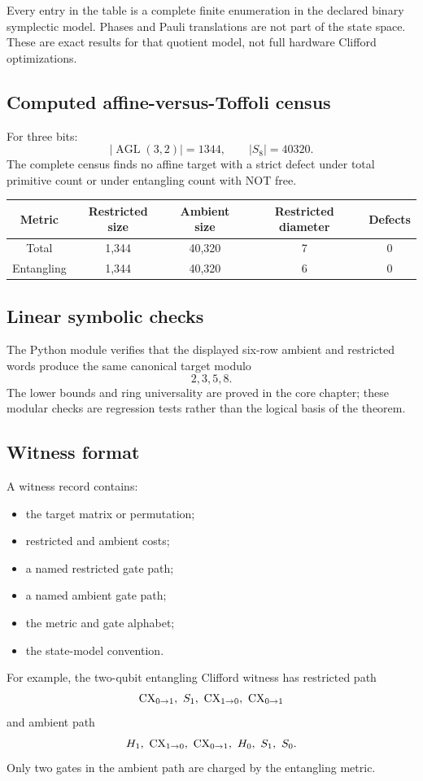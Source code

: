 \begin{computedbox}
Every entry in the table is a complete finite enumeration in the declared binary symplectic model.  Phases and Pauli translations are not part of the state space.  These are exact results for that quotient model, not full hardware Clifford optimizations.
\end{computedbox}

\subsection{Computed affine-versus-Toffoli census}
For three bits:
\[
|\operatorname{AGL}(3,2)|=1344,
\qquad
|S_8|=40320.
\]
The complete census finds no affine target with a strict defect under total primitive count or under entangling count with NOT free.

\begin{longtable}{@{}ccccc@{}}
\toprule
Metric & Restricted size & Ambient size & Restricted diameter & Defects\\
\midrule
Total & 1,344 & 40,320 & 7 & 0\\
Entangling & 1,344 & 40,320 & 6 & 0\\
\bottomrule
\end{longtable}

\subsection{Linear symbolic checks}
The Python module verifies that the displayed six-row ambient and restricted words produce the same canonical target modulo
\[
2,3,5,8.
\]
The lower bounds and ring universality are proved in the core chapter; these modular checks are regression tests rather than the logical basis of the theorem.

\subsection{Witness format}
A witness record contains:
\begin{itemize}
\item the target matrix or permutation;
\item restricted and ambient costs;
\item a named restricted gate path;
\item a named ambient gate path;
\item the metric and gate alphabet;
\item the state-model convention.
\end{itemize}
For example, the two-qubit entangling Clifford witness has restricted path
\[
\CX_{0\to1},\ S_1,\ \CX_{1\to0},\ \CX_{0\to1}
\]
and ambient path
\[
H_1,\ \CX_{1\to0},\ \CX_{0\to1},\ H_0,\ S_1,\ S_0.
\]
Only two gates in the ambient path are charged by the entangling metric.

